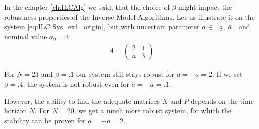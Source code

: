 \begin{exam}
	\label{ex:Rob:robvsN}
	In the chapter \ref{ch:ILCAlg} we said, that the choice of $\beta$ might impact the robustness properties of the Inverse Model Algorithms.
	Let us illustrate it on the system \eqref{eq:ILC:Sys_ex1_origin}, but with uncertain parameter $a \in [\underline{a}, \; \overline{a}]$ and nominal value $a_0 = 4$: 
	\begin{align}
	A = \begin{pmatrix}
	2 & 1 \\  a & 3
	\end{pmatrix}
	\end{align}
			
	For $N = 23$ and $\beta = .1$ our system still stays robust for $\overline a = - \underline a = 2$. If we set $\beta = .4$, the system is not robust even for $\overline a = - \underline a = .1$. 
	
	However, the ability to find the adequate matrices $X$ and $P$ depends on the time horizon $N$. 
	For $N = 20$, we get a much more robust system, for which the stability can be proven for $\overline a = - \underline a = 2$. 
	

		
\end{exam}


	

	
	
	
	

	

